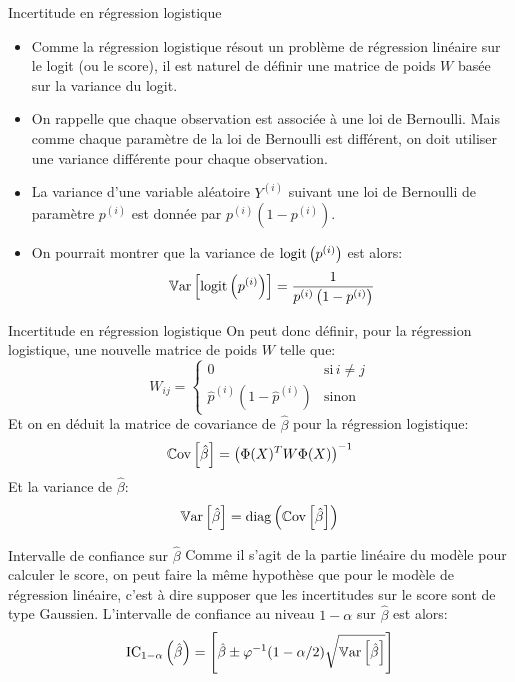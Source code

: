 \begin{frame}{Incertitude en régression logistique}
	\begin{itemize}
		\item Comme la régression logistique résout un problème de régression linéaire sur le logit (ou le score), il est naturel de définir une matrice de poids $W$ basée sur la variance du logit.
		\pause
		\item On rappelle que chaque observation est associée à une loi de Bernoulli. Mais comme chaque paramètre de la loi de Bernoulli est différent, on doit utiliser une variance différente pour chaque observation.
		\pause
		\item La variance d'une variable aléatoire $Y^{(i)}$ suivant une loi de Bernoulli de paramètre $p^{(i)}$ est donnée par $p^{(i)} \left(1 - p^{(i)}\right)$.
		\pause
		\item On pourrait montrer que la variance de $\operatorname{logit}\left(p^{(i)}\right)$ est alors: 
		\begin{equation}
			\operatorname{\mathbb{V}ar}\left[\operatorname{logit}\left(p^{(i)}\right)\right] = \frac{1}{p^{(i)}\left(1 - p^{(i)}\right)}
			\nonumber
		\end{equation}
	\end{itemize}
\end{frame}

\begin{frame}{Incertitude en régression logistique}
	On peut donc définir, pour la régression logistique, une nouvelle matrice de poids $W$ telle que:
	\begin{equation}
		W_{ij} = \begin{cases}
			0 & \text{si} \, i \ne j \\
			\hat{p}^{(i)}\left(1 - \hat{p}^{(i)}\right) & \text{sinon}
		\end{cases}
		\nonumber
	\end{equation}
	\pause
	Et on en déduit la matrice de covariance de $\hat{\beta}$ pour la régression logistique:
	\begin{equation}
		\operatorname{\mathbb{C}ov}\left[\hat{\beta}\right] = \left(\Phi(X)^T W \Phi(X)\right)^{-1}
		\nonumber
	\end{equation}
	\pause
	Et la variance de $\hat{\beta}$:
	\begin{equation}
		\operatorname{\mathbb{V}ar}\left[\hat{\beta}\right] = \operatorname{diag} \left(\operatorname{\mathbb{C}ov}\left[\hat{\beta}\right]\right)
		\nonumber
	\end{equation}	
\end{frame}

\begin{frame}{Intervalle de confiance sur $\hat{\beta}$}
	Comme il s'agit de la partie linéaire du modèle pour calculer le score, on peut faire la même hypothèse que pour le modèle de régression linéaire, c'est à dire supposer que les incertitudes sur le score sont de type Gaussien. L'intervalle de confiance au niveau $1 - \alpha$ sur $\hat{\beta}$ est alors:
	\begin{equation}
		\text{IC}_{1-\alpha}\left(\hat{\beta}\right) = \left[\hat{\beta} \pm \varphi^{-1}(1 - \alpha/2) \sqrt{\operatorname{\mathbb{V}ar}\left[\hat{\beta}\right]}\right]
		\nonumber
	\end{equation}	
\end{frame}

